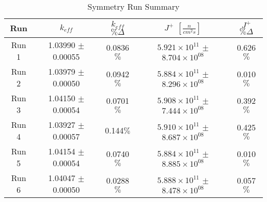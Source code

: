
\begin{table}[H]
\centering
 \begin{tabularx}{0.7\textwidth}{c  c  c  c  c}
 	\hline
 	Run & $k_{eff}$ & $k_{eff}$ $\% \Delta$ & $J^+$  $[\frac{n}{cm^2s}]$ & $J^+$ $\% \Delta$  \\
 	\hline
 	Run 1 & 1.03990 $\pm$ 0.00055 & 0.0836$\%$ & $5.921\times10^{11}$ $\pm$ $8.704\times10^{08}$ & 0.626$\%$ \\
 	Run 2 & 1.03979 $\pm$ 0.00050 & 0.0942$\%$ & $5.884\times10^{11}$ $\pm$ $8.296\times10^{08}$ & 0.010$\%$ \\
 	Run 3 & 1.04150 $\pm$ 0.00054 & 0.0701$\%$ & $5.908\times10^{11}$ $\pm$ $7.444\times10^{08}$ & 0.392$\%$ \\
 	Run 4 & 1.03927 $\pm$ 0.00057 & 0.144$\%$ & $5.910\times10^{11}$ $\pm$ $8.687\times10^{08}$ & 0.425$\%$ \\
 	Run 5 & 1.04154 $\pm$ 0.00054 & 0.0740$\%$ & $5.884\times10^{11}$ $\pm$ $8.885\times10^{08}$ & 0.010$\%$ \\
 	Run 6 & 1.04047 $\pm$ 0.00050 & 0.0288$\%$ & $5.888\times10^{11}$ $\pm$ $8.478\times10^{08}$ & 0.057$\%$ \\
 	\hline

 \end{tabularx}
\caption{Symmetry Run Summary}
\label{table:slicesens}
\end{table}